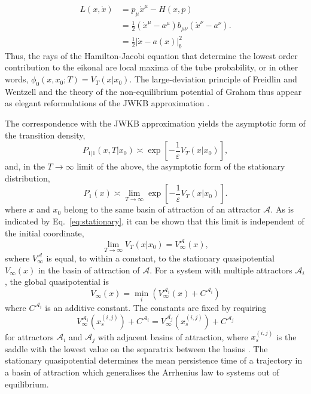 \begin{align}
L(x,\dot{x}) & =p_{\mu}\dot{x}^{\mu}-H(x,p)\label{eq:Legendre-form-of-Lagrangian}\\
 & =\frac{1}{2}(\dot{x}^{\mu}-a^{\mu})b_{\mu\nu}(\dot{x}^{\nu}-a^{\nu}).\nonumber \\
 & =\frac{1}{2}|\dot{x}-a(x)|_{b}^{2}\nonumber 
\end{align}
Thus, the rays of the Hamilton-Jacobi equation that determine the
lowest order contribution to the eikonal are local maxima of the tube
probability, or in other words, $\phi_{0}(x,x_{0};T)=V_{T}(x|x_{0})$.
The large-deviation principle of Freidlin and Wentzell and the theory
of the non-equilibrium potential of Graham \citep{graham1973statistical,graham1987macroscopic}
thus appear as elegant reformulations of the JWKB approximation \citep{ludwig1975persistence}. 

The correspondence with the JWKB approximation yields the asymptotic
form of the transition density,
\begin{equation}
P_{1|1}(x,T|x_{0})\asymp\exp\left[-\frac{1}{\varepsilon}V_{T}(x|x_{0})\right],
\end{equation}
and, in the $T\rightarrow\infty$ limit of the above, the asymptotic
form of the stationary distribution,
\begin{equation}
P_{1}(x)\asymp\lim_{T\to\infty}\exp\left[-\frac{1}{\varepsilon}V_{T}(x|x_{0})\right].\label{eq:stationary}
\end{equation}
where $x$ and $x_{0}$ belong to the same basin of attraction of
an attractor $\mathcal{A}$. As is indicated by Eq.~\ref{eq:stationary},
it can be shown that this limit is independent of
the initial coordinate,
\begin{equation}
\lim_{T\to\infty}V_{T}(x|x_{0})=V_{\infty}^{\mathcal{A}}(x),
\end{equation}
swhere $V_{\infty}^{\mathcal{A}}$ is equal, to within a constant,
to the stationary quasipotential $V_{\infty}(x)$ in the basin of
attraction of $\mathcal{A}$. For a system with multiple attractors
$\mathcal{A}_{i}$, the global quasipotential is
\begin{equation}
V_{\infty}(x)=\min_{i}\left(V_{\infty}^{\mathcal{A}_{i}}(x)+C^{\mathcal{A}_{i}}\right)\label{eq:aggregated quasipotential}
\end{equation}
where $C^{\mathcal{A}_{i}}$ is an additive constant. The constants
are fixed by requiring
\begin{equation}
V_{\infty}^{\mathcal{A}_{i}}(x_{s}^{(i,j)})+C^{\mathcal{A}_{i}}=V_{\infty}^{\mathcal{A}_{j}}(x_{s}^{(i,j)})+C^{\mathcal{A}_{j}}
\end{equation}
for attractors $\mathcal{A}_{i}$ and $\mathcal{A}_{j}$ with adjacent
basins of attraction, where $x_{s}^{(i,j)}$ is the saddle with the
lowest value on the separatrix between the basins \citep{graham1987macroscopic}.
The stationary quasipotential determines the mean persistence time
of a trajectory in a basin of attraction which generalises the Arrhenius
law to systems out of equilibrium. 

